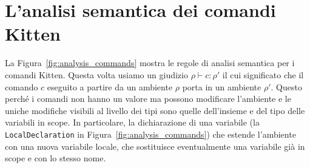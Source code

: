 \section{L'analisi semantica dei comandi Kitten}
  \label{sec:analysis_commands}
%
La Figura~\ref{fig:analysis_commands} mostra le regole di analisi semantica
per i comandi Kitten. Questa volta usiamo un giudizio
$\rho\vdash c:\rho'$ il cui significato \e che il comando $c$
eseguito a partire da un ambiente $\rho$ porta in un ambiente $\rho'$.
Questo perch\'e i comandi non hanno un valore ma possono modificare l'ambiente
e le uniche modifiche visibili al livello dei tipi sono quelle dell'insieme
e del tipo delle variabili in scope. In particolare, \e la dichiarazione di una
variabile (la \texttt{LocalDeclaration} in Figura~\ref{fig:analysis_commands})
che estende l'ambiente con una nuova variabile locale, che sostituisce
eventualmente una variabile gi\`a in scope e con lo stesso nome.

